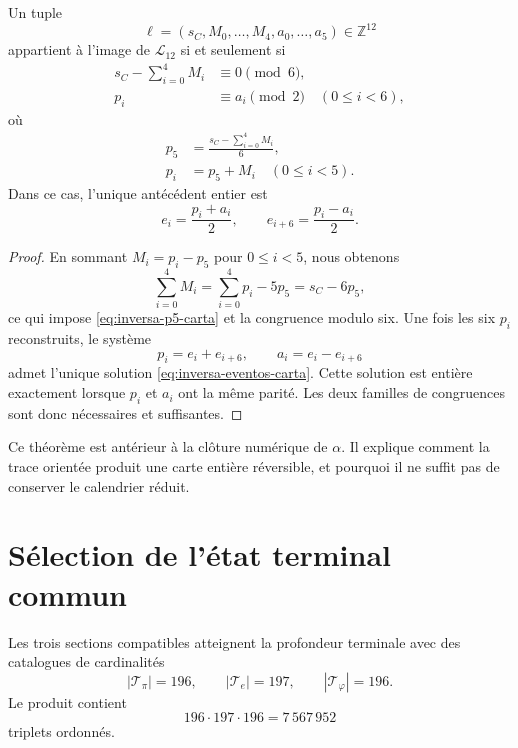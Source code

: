 \begin{theorem}
\label{thm:inversion-carta-integral-156}
Un tuple
\[
 \ell=(s_C,M_0,\ldots,M_4,a_0,\ldots,a_5)\in\mathbb Z^{12}
\]
appartient à l’image de \(\mathcal L_{12}\) si et seulement si
\begin{align}
 s_C-\sum_{i=0}^{4}M_i&\equiv0\pmod6,
 \label{eq:congruencia-seis-carta}\\
 p_i&\equiv a_i\pmod2
 \quad(0\leq i<6),
 \label{eq:congruencia-paridad-carta}
\end{align}
où
\begin{align}
 p_5&=\frac{s_C-\sum_{i=0}^{4}M_i}{6},
 \label{eq:inversa-p5-carta}\\
 p_i&=p_5+M_i\quad(0\leq i<5).
 \label{eq:inversa-pi-carta}
\end{align}
Dans ce cas, l’unique antécédent entier est
\begin{equation}
 e_i=\frac{p_i+a_i}{2},
 \qquad
 e_{i+6}=\frac{p_i-a_i}{2}.
 \label{eq:inversa-eventos-carta}
\end{equation}
\end{theorem}

\begin{proof}
En sommant \(M_i=p_i-p_5\) pour \(0\leq i<5\), nous obtenons
\[
 \sum_{i=0}^{4}M_i
 =\sum_{i=0}^{4}p_i-5p_5
 =s_C-6p_5,
\]
ce qui impose \eqref{eq:inversa-p5-carta} et la congruence modulo six.
Une fois les six \(p_i\) reconstruits, le système
\[
 p_i=e_i+e_{i+6},
 \qquad a_i=e_i-e_{i+6}
\]
admet l’unique solution \eqref{eq:inversa-eventos-carta}. Cette solution est
entière exactement lorsque \(p_i\) et \(a_i\) ont la même parité.
Les deux familles de congruences sont donc nécessaires et suffisantes.
\end{proof}

Ce théorème est antérieur à la clôture numérique de \(\alpha\). Il explique comment la
trace orientée produit une carte entière réversible, et pourquoi il ne suffit pas
de conserver le calendrier réduit.

\section{Sélection de l’état terminal commun}

Les trois sections compatibles atteignent la profondeur terminale avec des catalogues
de cardinalités
\[
 |\mathcal T_\pi|=196,
 \qquad
 |\mathcal T_e|=197,
 \qquad
 |\mathcal T_\varphi|=196.
\]
Le produit contient
\begin{equation}
 196\cdot197\cdot196=7\,567\,952
 \label{eq:cardinal-producto-terminal}
\end{equation}
triplets ordonnés.


